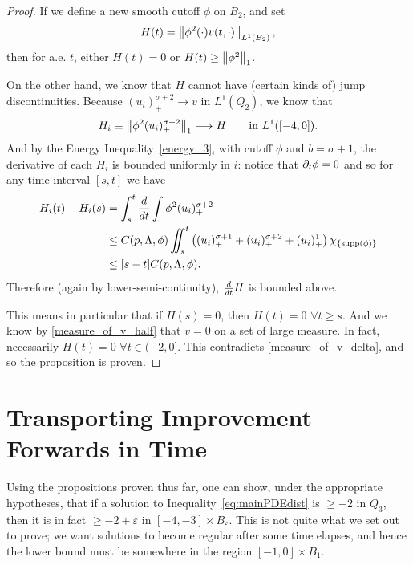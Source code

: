 \begin{proof}
If we define a new smooth cutoff $\phi$ on $B_2$, and set
\[ H(t) = \left\lVert\phi^2(\cdot)v(t,\cdot)\right\rVert_{L^1(B_2)},\]
then for a.e. $t$, either $H(t) = 0$ or $H(t) \geq \left\lVert\phi^2\right\rVert_1$.  

On the other hand, we know that $H$ cannot have (certain kinds of) jump discontinuities.  Because $(u_i)_+^{\sigma+2} \to v$ in $L^1(Q_2)$, we know that 
\[ H_i \equiv \left\lVert\phi^2 (u_i)_+^{\sigma+2}\right\rVert_1 \longrightarrow H \qquad \textrm{in } L^1([-4,0]).\]  
And by the Energy Inequality~\eqref{energy_3}, with cutoff $\phi$ and $b = \sigma+1$, the derivative of each $H_i$ is bounded uniformly in $i$: notice that $\partial_t \phi = 0$ and so for any time interval $[s,t]$ we have
\begin{align*}
H_i(t) - H_i(s) &= \int_s^t \frac{d}{dt} \int \phi^2 (u_i)_+^{\sigma+2}
\\ &\leq C(p,\Lambda,\phi) \iint_s^t \left( (u_i)_+^{\sigma+1} + (u_i)_+^{\sigma+2} + (u_i)_+^1 \right) \chi_{\{\operatorname{supp}(\phi)\}}
\\ &\leq [s-t] C(p,\Lambda,\phi).
\end{align*}
Therefore (again by lower-semi-continuity), $\frac{d}{dt} H$ is bounded above.  

This means in particular that if $H(s) = 0$, then $H(t) = 0$ $\forall t \geq s$.  And we know by \eqref{measure_of_v_half} that $v = 0$ on a set of large measure.  In fact, necessarily $H(t) = 0$ $\forall t \in (-2,0]$.  This contradicts \eqref{measure_of_v_delta}, and so the proposition is proven.  

\end{proof}




\section{Transporting Improvement Forwards in Time}\label{sec:flowforward}




Using the propositions proven thus far, one can show, under the appropriate hypotheses, that if a solution to Inequality~\eqref{eq:mainPDEdist} is $\geq -2$ in $Q_3$, then it is in fact $\geq -2 + \varepsilon$ in $[-4,-3]\times B_\varepsilon$.  This is not quite what we set out to prove; we want solutions to become regular after some time elapses, and hence the lower bound must be somewhere in the region $[-1,0]\times B_1$.  

